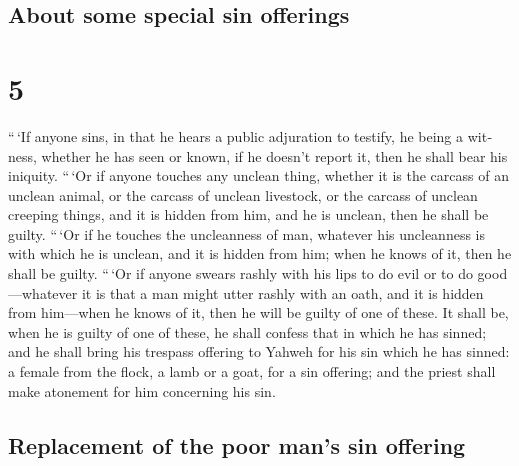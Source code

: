\begin{paracol}{2}
\switchcolumn
\begin{otherlanguage}{english}

\hypertarget{about-some-special-sin-offerings}{%
\subsection{About some special sin
offerings}\label{about-some-special-sin-offerings}}

\hypertarget{section-9}{%
\section{5}\label{section-9}}

 ``\,`If anyone sins, in that he hears a public adjuration
to testify, he being a witness, whether he has seen or known, if he
doesn't report it, then he shall bear his iniquity. 
``\,`Or if anyone touches any unclean thing, whether it is the carcass
of an unclean animal, or the carcass of unclean livestock, or the
carcass of unclean creeping things, and it is hidden from him, and he is
unclean, then he shall be guilty.  ``\,`Or if he touches
the uncleanness of man, whatever his uncleanness is with which he is
unclean, and it is hidden from him; when he knows of it, then he shall
be guilty.  ``\,`Or if anyone swears rashly with his lips
to do evil or to do good---whatever it is that a man might utter rashly
with an oath, and it is hidden from him---when he knows of it, then he
will be guilty of one of these.  It shall be, when he is
guilty of one of these, he shall confess that in which he has sinned;
 and he shall bring his trespass offering to Yahweh for
his sin which he has sinned: a female from the flock, a lamb or a goat,
for a sin offering; and the priest shall make atonement for him
concerning his sin.

\hypertarget{replacement-of-the-poor-mans-sin-offering}{%
\subsection{Replacement of the poor man's sin
offering}\label{replacement-of-the-poor-mans-sin-offering}}


\end{otherlanguage}
\end{paracol}
